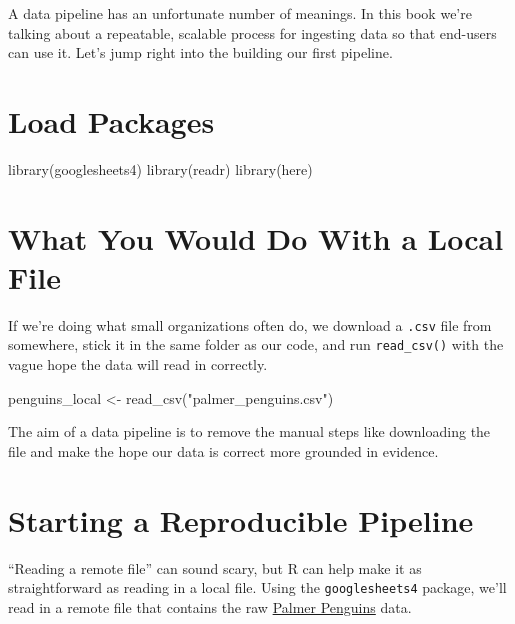 \documentclass[
  letterpaper,
  DIV=11,
  numbers=noendperiod]{scrreprt}
\newenvironment{Shaded}{\begin{snugshade}}{\end{snugshade}}
\newcommand{\FunctionTok}[1]{\textcolor[rgb]{0.28,0.35,0.67}{#1}}
\newcommand{\NormalTok}[1]{\textcolor[rgb]{0.00,0.23,0.31}{#1}}
\newcommand{\OtherTok}[1]{\textcolor[rgb]{0.00,0.23,0.31}{#1}}
\newcommand{\StringTok}[1]{\textcolor[rgb]{0.13,0.47,0.30}{#1}}
\begin{document}
A data pipeline has an unfortunate number of meanings. In this book
we're talking about a repeatable, scalable process for ingesting data so
that end-users can use it. Let's jump right into the building our first
pipeline.

\hypertarget{load-packages}{%
\section{Load Packages}\label{load-packages}}

\begin{Shaded}
\begin{Highlighting}[]
\FunctionTok{library}\NormalTok{(googlesheets4)}
\FunctionTok{library}\NormalTok{(readr)}
\FunctionTok{library}\NormalTok{(here)}
\end{Highlighting}
\end{Shaded}

\hypertarget{what-you-would-do-with-a-local-file}{%
\section{What You Would Do With a Local
File}\label{what-you-would-do-with-a-local-file}}

If we're doing what small organizations often do, we download a
\texttt{.csv} file from somewhere, stick it in the same folder as our
code, and run \texttt{read\_csv()} with the vague hope the data will
read in correctly.

\begin{Shaded}
\begin{Highlighting}[]
\NormalTok{penguins\_local }\OtherTok{\textless{}{-}} \FunctionTok{read\_csv}\NormalTok{(}\StringTok{"palmer\_penguins.csv"}\NormalTok{)}
\end{Highlighting}
\end{Shaded}

The aim of a data pipeline is to remove the manual steps like
downloading the file and make the hope our data is correct more grounded
in evidence.

\hypertarget{starting-a-reproducible-pipeline}{%
\section{Starting a Reproducible
Pipeline}\label{starting-a-reproducible-pipeline}}

``Reading a remote file'' can sound scary, but R can help make it as
straightforward as reading in a local file. Using the
\texttt{googlesheets4} package, we'll read in a remote file that
contains the raw
\href{https://allisonhorst.github.io/palmerpenguins/}{Palmer Penguins}
data.
\end{document}
